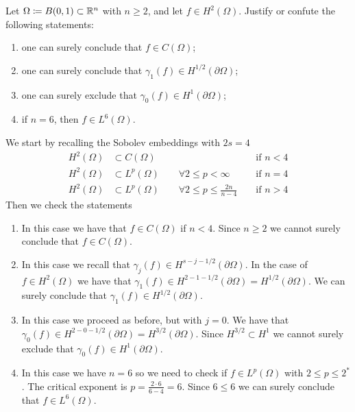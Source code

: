 \newpage
\begin{exercise}
    Let \(\Omega \coloneqq B(0, 1) \subset \mathbb{R}^n\) with \(n \geq 2\), and let \(f \in H^2(\Omega)\). Justify or confute the following statements:
    \begin{enumerate}
        \item one can surely conclude that \(f \in C(\Omega)\);
        \item one can surely conclude that \(\gamma_1(f) \in H^{1/2}(\partial\Omega)\);
        \item one can surely exclude that \(\gamma_0(f) \in H^{1}(\partial\Omega)\);
        \item if \(n = 6\), then \(f \in L^{6}(\Omega)\).
    \end{enumerate}
\end{exercise}
We start by recalling the Sobolev embeddings with \(2s = 4\)
\begin{align*}
    H^2(\Omega) & \subset C(\Omega)                                                 &  & \text{ if } n < 4 \\
    H^2(\Omega) & \subset L^p(\Omega) \qquad \forall 2 \leq p < \infty              &  & \text{ if } n = 4 \\
    H^2(\Omega) & \subset L^p(\Omega) \qquad \forall 2 \leq p \leq \frac{2n}{n - 4} &  & \text{ if } n > 4
\end{align*}
Then we check the statements
\begin{enumerate}
    \item In this case we have that \(f \in C(\Omega)\) if \(n < 4\). Since \(n \geq 2\)
          we cannot surely conclude that \(f \in C(\Omega)\).
    \item In this case we recall that \(\gamma_j(f) \in H^{s - j -
                  1/2}(\partial\Omega)\). In the case of \(f \in H^2(\Omega)\) we have that
          \(\gamma_1(f) \in H^{2 - 1 - 1/2}(\partial\Omega) = H^{1/2}(\partial\Omega)\).
          We can surely conclude that \(\gamma_1(f) \in H^{1/2}(\partial\Omega)\).
    \item In this case we proceed as before, but with \(j = 0\). We have that
          \(\gamma_0(f) \in H^{2 - 0 - 1/2}(\partial\Omega) = H^{3/2}(\partial\Omega)\).
          Since \(H^{3/2} \subset H^1\) we cannot surely exclude that \(\gamma_0(f) \in
          H^{1}(\partial\Omega)\).
    \item In this case we have \(n = 6\) so we need to check if \(f \in L^p(\Omega)\)
          with \(2\leq p \leq 2^*\). The critical exponent is \(p = \frac{2\cdot 6}{6 -
              4} = 6\). Since \(6 \leq 6\) we can surely conclude that \(f \in
          L^{6}(\Omega)\).
\end{enumerate}

